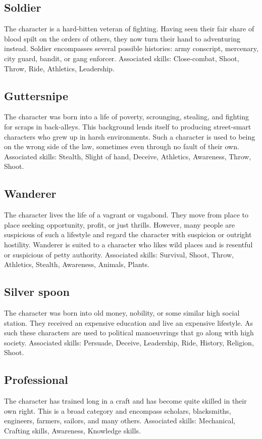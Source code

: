 \documentclass[a4paper,10pt,oneside]{book}
\begin{document}
\subsection{Soldier}
The character is a hard-bitten veteran of fighting. Having seen their fair share of blood spilt on the orders of others, they now turn their hand to adventuring instead. Soldier encompasses several possible histories: army conscript, mercenary, city guard, bandit, or gang enforcer. Associated skills: Close-combat, Shoot, Throw, Ride, Athletics, Leadership.

\subsection{Guttersnipe}
The character was born into a life of poverty, scrounging, stealing, and fighting for scraps in back-alleys. This background lends itself to producing street-smart characters who grew up in harsh environments. Such a character is used to being on the wrong side of the law, sometimes even through no fault of their own. Associated skills: Stealth, Slight of hand, Deceive, Athletics, Awareness, Throw, Shoot.

\subsection{Wanderer}
The character lives the life of a vagrant or vagabond. They move from place to place seeking opportunity, profit, or just thrills. However, many people are suspicious of such a lifestyle and regard the character with suspicion or outright hostility. Wanderer is suited to a character who likes wild places and is resentful or suspicious of petty authority. Associated skills: Survival, Shoot, Throw, Athletics, Stealth, Awareness, Animals, Plants.

\subsection{Silver spoon}
The character was born into old money, nobility, or some similar high social station. They received an expensive education and live an expensive lifestyle. As such these characters are used to political manoeuvrings that go along with high society. Associated skills: Persuade, Deceive, Leadership, Ride, History, Religion, Shoot.

\subsection{Professional}
The character has trained long in a craft and has become quite skilled in their own right. This is a broad category and encompass scholars, blacksmiths, engineers, farmers, sailors, and many others. Associated skills: Mechanical, Crafting skills, Awareness, Knowledge skills. 
\end{document}
